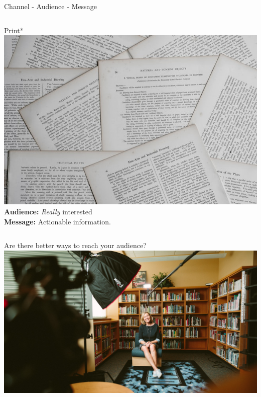 \begin{frame}{Channel - Audience - Message}
\begin{columns}
    \begin{column}{0.3\textwidth}
        \begin{block}{Print*}
        \centering
            \includegraphics[width=\textwidth]{images/annie-spratt-5cFwQ-WMcJU-unsplash.jpg}
            {\small
            \textbf{Audience:} \emph{Really} interested\\
            \textbf{Message:} Actionable information. %
            }
        \end{block}
    \end{column}
    
\end{columns}

\end{frame}


\begin{frame}{Are there better ways to reach your audience?}
\centering
\includegraphics[height=0.7\textheight]{images/sam-mcghee-4siwRamtFAk-unsplash.jpg}

\end{frame}

